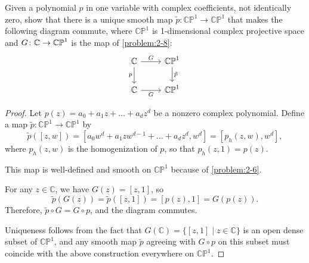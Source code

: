 \begin{problem}
    Given a polynomial $p$ in one variable with complex coefficients, not identically zero, show that there is a unique smooth map $\tilde{p} \colon \mathbb{CP}^1 \to \mathbb{CP}^1$ that makes the following diagram commute, where $\mathbb{CP}^1$ is 1-dimensional complex projective space and $G \colon \mathbb{C} \to \mathbb{CP}^1$ is the map of \cref{problem:2-8}:
    \[
    \begin{tikzcd}
    \C \arrow[r, "G"] \arrow[d, "p"'] & \mathbb{CP}^1 \arrow[d, "\tilde{p}"] \\
    \C \arrow[r, "G"'] & \mathbb{CP}^1
    \end{tikzcd}
    \]
    \begin{proof}
    Let \( p(z) = a_0 + a_1 z + \dots + a_d z^d \) be a nonzero complex polynomial. Define a map \( \tilde{p} \colon \mathbb{CP}^1 \to \mathbb{CP}^1 \) by
    \[
    \tilde{p}([z, w]) = [a_0 w^d + a_1 z w^{d-1} + \dots + a_d z^d , w^d] = [p_h(z,w), w^d],
    \]
    where \( p_h(z,w) \) is the homogenization of \( p \), so that \( p_h(z,1) = p(z) \).

    This map is well-defined and smooth on \( \mathbb{CP}^1 \) because of \cref{problem:2-6}.

    For any \( z \in \mathbb{C} \), we have \( G(z) = [z , 1] \), so
    \[
    \tilde{p}(G(z)) = \tilde{p}([z , 1]) = [p(z) , 1] = G(p(z)).
    \]
    Therefore, \( \tilde{p} \circ G = G \circ p \), and the diagram commutes.

    Uniqueness follows from the fact that \( G(\mathbb{C}) = \{ [z , 1] \mid z \in \mathbb{C} \} \) is an open dense subset of \( \mathbb{CP}^1 \), and any smooth map \( \tilde{p} \) agreeing with \( G \circ p \) on this subset must coincide with the above construction everywhere on \( \mathbb{CP}^1 \).
\end{proof}
\end{problem}

